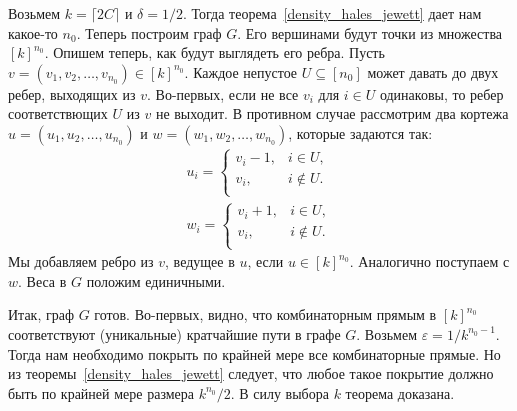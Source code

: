 \documentclass[12pt]{article}
\begin{document}
    Возьмем $k = \lceil 2C \rceil$ и $\delta = 1/2$. Тогда теорема~\ref{density_hales_jewett}
    дает нам какое-то $n_0$. Теперь построим граф $G$. Его вершинами будут точки из множества
    $[k]^{n_0}$.
    Опишем теперь, как будут выглядеть его ребра. Пусть $v = (v_1, v_2, \ldots, v_{n_0}) \in [k]^{n_0}$.
    Каждое непустое $U \subseteq [n_0]$ может давать до двух ребер, выходящих из $v$.
    Во-первых, если не все $v_i$ для $i \in U$ одинаковы, то ребер соответствющих $U$ из $v$
    не выходит.
    В противном случае рассмотрим два кортежа
    $u = (u_1, u_2, \ldots, u_{n_0})$ и $w = (w_1, w_2, \ldots, w_{n_0})$,
    которые задаются так:
    \begin{eqnarray*}
        u_i = \begin{cases}
            v_i - 1, & i \in U,\\
            v_i, & i \notin U.\\
        \end{cases}\\
        w_i = \begin{cases}
            v_i + 1, & i \in U,\\
            v_i, & i \notin U.\\
        \end{cases}
    \end{eqnarray*}
    Мы добавляем ребро из $v$, ведущее в $u$, если $u \in [k]^{n_0}$. Аналогично поступаем с $w$.
    Веса в $G$ положим единичными.

    Итак, граф $G$ готов.
    Во-первых, видно, что комбинаторным прямым в $[k]^{n_0}$ соответствуют (уникальные) кратчайшие пути в графе $G$.
    Возьмем $\varepsilon = 1 / k^{n_0-1}$. Тогда нам необходимо покрыть по крайней мере
    все комбинаторные прямые.
    Но из теоремы~\ref{density_hales_jewett} следует,
    что любое такое покрытие должно быть по крайней мере размера
    $k^{n_0} / 2$. В силу выбора $k$ теорема доказана.
\end{document}
